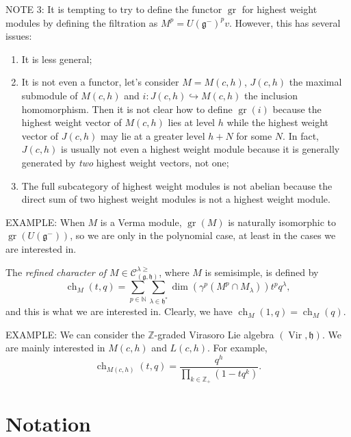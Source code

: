 \documentclass[a4paper, 12pt, reqno]{amsart}
\DeclareMathOperator{\Vir}{Vir}
\DeclareMathOperator{\ch}{ch}
\DeclareMathOperator{\gr}{gr}
\begin{document}
NOTE 3: It is tempting to try to define the functor $\gr$ for highest weight modules by defining the filtration as $M^p = U(\mathfrak{g}^-)^pv$.
However, this has several issues:
\begin{enumerate}
\item It is less general;
\item It is not even a functor, let's consider $M = M(c, h)$, $J(c, h)$ the maximal submodule of $M(c, h)$ and $i: J(c, h) \hookrightarrow M(c, h)$ the inclusion homomorphism.
  Then it is not clear how to define $\gr(i)$ because the highest weight vector of $M(c, h)$ lies at level $h$ while the highest weight vector of $J(c, h)$ may lie at a greater level $h + N$ for some $N$.
  In fact, $J(c, h)$ is usually not even a highest weight module because it is generally generated by \emph{two} highest weight vectors, not one;
\item The full subcategory of highest weight modules is not abelian because the direct sum of two highest weight modules is not a highest weight module.
\end{enumerate}

EXAMPLE: When $M$ is a Verma module, $\gr(M)$ is naturally isomorphic to $\gr(U(\mathfrak{g}^-))$, so we are only in the polynomial case, at least in the cases we are interested in.

The \emph{refined character of $M \in \mathcal{C}^{\lambda \ge}_{(\mathfrak{g}, \mathfrak{h})}$}, where $M$ is semisimple, is defined by
\begin{equation*}
  \ch_M(t, q) = \sum_{p \in \mathbb{N}}\sum_{\lambda \in \mathfrak{h}^*}\dim(\gamma^p(M^p \cap M_{\lambda}))t^pq^{\lambda},
\end{equation*}
and this is what we are interested in.
Clearly, we have $\ch_M(1, q) = \ch_M(q)$.

EXAMPLE: We can consider the $\mathbb{Z}$-graded Virasoro Lie algebra $(\Vir, \mathfrak{h})$.
We are mainly interested in $M(c, h)$ and $L(c, h)$.
For example,
\begin{equation*}
  \ch_{M(c, h)}(t, q) = \frac{q^h}{\prod_{k \in \mathbb{Z}_+}(1 - tq^k)}.
\end{equation*}

\section{Notation}
\label{sec:notation}
\end{document}
